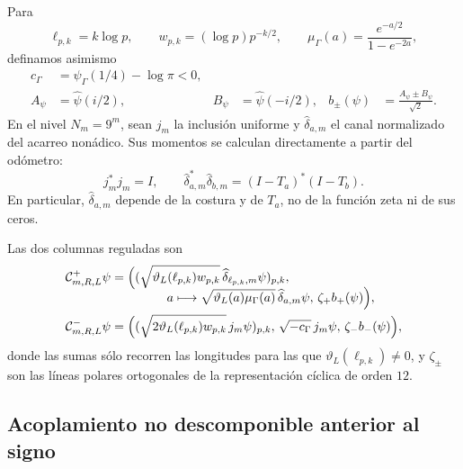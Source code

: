 Para
\[
 \ell_{p,k}=k\log p,\qquad
 w_{p,k}=(\log p)p^{-k/2},\qquad
 \mu_\Gamma(a)=\frac{e^{-a/2}}{1-e^{-2a}},
\]
definamos asimismo
\begin{align*}
 c_\Gamma&=\psi_\Gamma(1/4)-\log\pi<0,\\
 A_\psi&=\widehat\psi(i/2),&
 B_\psi&=\widehat\psi(-i/2),&
 b_\pm(\psi)&=\frac{A_\psi\pm B_\psi}{\sqrt2}.
\end{align*}
En el nivel \(N_m=9^m\), sean \(j_m\) la inclusión uniforme y
\(\widehat\delta_{a,m}\) el canal normalizado del acarreo nonádico. Sus
momentos se calculan directamente a partir del odómetro:
\begin{equation}\label{eq:amp-rh-momentos-odometro-explicitos}
 j_m^*j_m=I,\qquad
 \widehat\delta_{a,m}^*\widehat\delta_{b,m}
 =(I-T_a)^*(I-T_b).
\end{equation}
En particular, \(\widehat\delta_{a,m}\) depende de la costura y de
\(T_a\), no de la función zeta ni de sus ceros.

Las dos columnas reguladas son
\begin{align}
 \mathcal C^+_{m,R,L}\psi
 ={}&
 \Bigl(
  (\sqrt{\vartheta_L(\ell_{p,k})w_{p,k}}\,
       \widehat\delta_{\ell_{p,k},m}\psi)_{p,k},
 \nonumber\\[-2mm]
 &\hspace{11mm}
  a\longmapsto
  \sqrt{\vartheta_L(a)\mu_\Gamma(a)}\,
       \widehat\delta_{a,m}\psi,\,
  \zeta_+b_+(\psi)
 \Bigr),                                             \label{eq:amp-rh-columna-mas-explicita}\\
 \mathcal C^-_{m,R,L}\psi
 ={}&
 \Bigl(
  (\sqrt{2\vartheta_L(\ell_{p,k})w_{p,k}}\,j_m\psi)_{p,k},\,
  \sqrt{-c_\Gamma}\,j_m\psi,\,
  \zeta_-b_-(\psi)
 \Bigr),                                             \label{eq:amp-rh-columna-menos-explicita}
\end{align}
donde las sumas sólo recorren las longitudes para las que
\(\vartheta_L(\ell_{p,k})\neq0\), y \(\zeta_\pm\) son las líneas polares
ortogonales de la representación cíclica de orden \(12\).

\subsection*{Acoplamiento no descomponible anterior al signo}

